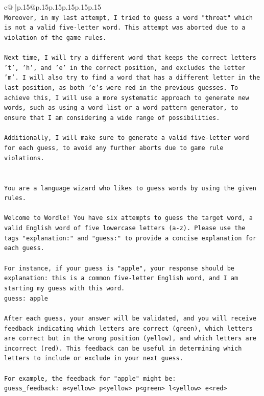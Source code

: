 \documentclass{article}
\begin{document}
{\begin{supertabular}{c@{$\;$}|p{.15\linewidth}@{}p{.15\linewidth}p{.15\linewidth}p{.15\linewidth}p{.15\linewidth}p{.15\linewidth}}
{{{\\ 
\texttt{Moreover, in my last attempt, I tried to guess a word "throat" which is not a valid five{-}letter word. This attempt was aborted due to a violation of the game rules.} \\
\\ 
\texttt{Next time, I will try a different word that keeps the correct letters 't', 'h', and 'e' in the correct position, and excludes the letter 'm'. I will also try to find a word that has a different letter in the last position, as both 'e's were red in the previous guesses. To achieve this, I will use a more systematic approach to generate new words, such as using a word list or a word pattern generator, to ensure that I am considering a wide range of possibilities. } \\
\\ 
\texttt{Additionally, I will make sure to generate a valid five{-}letter word for each guess, to avoid any further aborts due to game rule violations.} \\
\\ 
\\ 
\texttt{You are a language wizard who likes to guess words by using the given rules.} \\
\\ 
\texttt{Welcome to Wordle! You have six attempts to guess the target word, a valid English word of five lowercase letters (a{-}z). Please use the tags "explanation:" and "guess:" to provide a concise explanation for each guess.} \\
\\ 
\texttt{For instance, if your guess is "apple", your response should be} \\
\texttt{explanation: this is a common five{-}letter English word, and I am starting my guess with this word.} \\
\texttt{guess: apple} \\
\\ 
\texttt{After each guess, your answer will be validated, and you will receive feedback indicating which letters are correct (green), which letters are correct but in the wrong position (yellow), and which letters are incorrect (red). This feedback can be useful in determining which letters to include or exclude in your next guess.} \\
\\ 
\texttt{For example, the feedback for "apple" might be:} \\
\texttt{guess\_feedback: a<yellow> p<yellow> p<green> l<yellow> e<red>} \\
}}}
\end{supertabular}}
\end{document}
